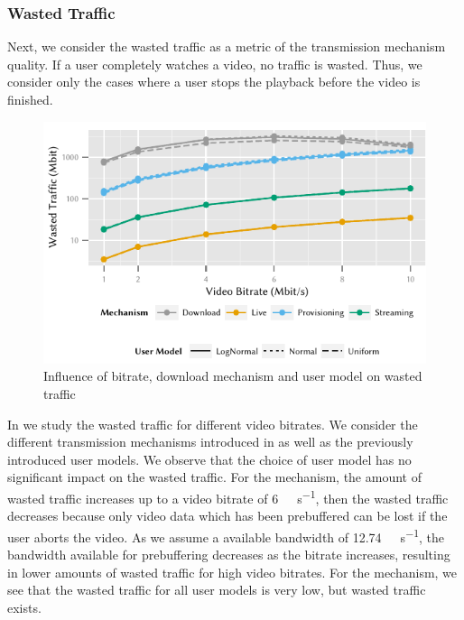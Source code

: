 \subsubsection*{Wasted Traffic}\label{sec:application:lte_video:numerical_evaluation:wasted_traffic}
Next, we consider the wasted traffic as a metric of the transmission mechanism quality.
If a user completely watches a video, no traffic is wasted.
Thus, we consider only the cases where a user stops the playback before the video is finished.
\begin{figure}
  \centering
  \includegraphics{application/lte_video/numerical_evaluation/figures/bitrate2lostData}
  \caption{Influence of bitrate, download mechanism and user model on wasted traffic}
  \label{fig:application:lte_video:numerical_evaluation:energy_consumption:bitrate2lostData}
\end{figure}
In  we study the wasted traffic for different video bitrates.
We consider the different transmission mechanisms introduced in  as well as the previously introduced user models.
We observe that the choice of user model has no significant impact on the wasted traffic.
For the \download mechanism, the amount of wasted traffic increases up to a video bitrate of \SI{6}{\mega\bit\per\second}, then the wasted traffic decreases because only video data which has been prebuffered can be lost if the user aborts the video.
As we assume a available bandwidth of \SI{12.74}{\mega\bit\per\second}, the bandwidth available for prebuffering decreases as the bitrate increases, resulting in lower amounts of wasted traffic for high video bitrates.
For the \live mechanism, we see that the wasted traffic for all user models is very low, but wasted traffic exists.
